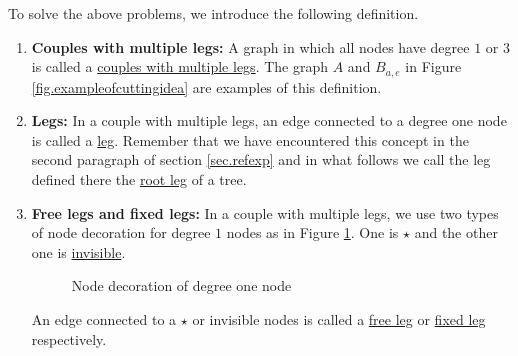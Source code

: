 To solve the above problems, we introduce the following definition.

\begin{defn}\label{def.couplemultileg}
\begin{enumerate}
    \item \textbf{Couples with multiple legs:} A graph in which all nodes have degree $1$ or $3$ is called a \underline{couples with multiple legs}. The graph $A$ and $B_{a,e}$ in Figure \ref{fig.exampleofcuttingidea} are examples of this definition.
    \item \textbf{Legs:} In a couple with multiple legs, an edge connected to a degree one node is called a \underline{leg}. Remember that we have encountered this concept in the second paragraph of section \ref{sec.refexp} and in what follows we call the leg defined there the \underline{root leg} of a tree.   
    \item \textbf{Free legs and fixed legs:} In a couple with multiple legs, we use two types of node decoration for degree $1$ nodes as in Figure \ref{fig.decorationdegreeone}. One is $\star$ and the other one is \underline{invisible}. 
    \begin{figure}[H]
    \centering
        \caption{Node decoration of degree one node}
        \label{fig.decorationdegreeone}
    \end{figure}
    An edge connected to a $\star$ or invisible nodes is called a \underline{free leg} or \underline{fixed leg} respectively. 
    

\end{enumerate}
\end{defn}
